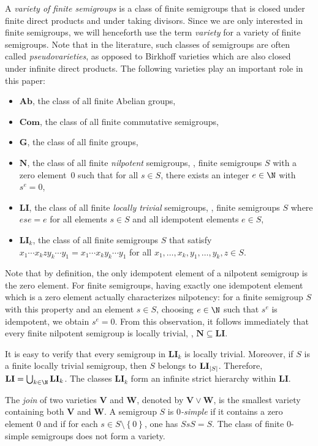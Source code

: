 \documentclass{toc}
\newcommand{\abs}[1]{\ensuremath\left|#1\right|}
\newcommand{\os}[1]{\ensuremath{\left\{#1\right\}}}
\newcommand{\vV}{\mathbf{V}}
\newcommand{\vW}{\mathbf{W}}
\newcommand{\vAb}{\mathbf{Ab}}
\newcommand{\vNil}{\mathbf{N}}
\newcommand{\vLI}{\mathbf{LI}}
\newcommand{\vCom}{\mathbf{Com}}
\newcommand{\vG}{\mathbf{G}}
\begin{document}
A \emph{variety of finite semigroups} is a class of finite semigroups that is
closed under finite direct products and under taking divisors.
%
Since we are only interested in finite semigroups, we will henceforth use the
term \emph{variety} for a variety of finite semigroups.
%
Note that in the literature, such classes of semigroups are often called
\emph{pseudovarieties}, as opposed to Birkhoff varieties which are also closed
under infinite direct products.
%
The following varieties play an important role in this paper:
%
\begin{itemize}
  \item $\vAb$, the class of all finite Abelian groups,
  \item $\vCom$, the class of all finite commutative semigroups,
  \item $\vG$, the class of all finite groups,
  \item $\vNil$, the class of all finite \emph{nilpotent} semigroups, \ie, finite
    semigroups $S$ with a zero element~$0$ such that for all $s \in S$, there
    exists an integer $e \in \N$ with $s^e = 0$,
  \item $\vLI$, the class of all finite \emph{locally trivial} semigroups, \ie,
    finite semigroups $S$ where $ese = e$ for all elements $s \in S$ and all
    idempotent elements $e \in S$,
  \item $\vLI_k$, the class of all finite semigroups $S$ that satisfy $x_1
    \cdots x_k z y_k \cdots y_1 = x_1 \cdots x_k y_k \cdots y_1$ for all $x_1,
    \dots, x_k, y_1, \dots, y_k, z \in S$.
\end{itemize}
%
Note that by definition, the only idempotent element of a nilpotent semigroup
is the zero element.
%
For finite semigroups, having exactly one idempotent element which is a zero
element actually characterizes nilpotency:
%
for a finite semigroup $S$ with this property and an element $s \in S$,
choosing $e \in \N$ such that $s^e$ is idempotent, we obtain $s^e = 0$.
%
{}From this observation, it follows immediately that every finite nilpotent
semigroup is locally trivial, \ie, $\vNil \subseteq \vLI$.
%

It is easy to verify that every semigroup in $\vLI_k$ is locally trivial.
Moreover, if $S$ is a finite locally trivial semigroup, then $S$ belongs to
$\vLI_{\abs{S}}$. Therefore, $\vLI = \bigcup_{k \in \N} \vLI_k$. The classes
$\vLI_k$ form an infinite strict hierarchy within $\vLI$.

The \emph{join} of two varieties $\vV$ and $\vW$, denoted by $\vV \lor \vW$, is
the smallest variety containing both $\vV$ and $\vW$.
%
A semigroup $S$ is \emph{$0$-simple} if it contains a zero element $0$ and if
for each $s \in S \setminus \os{0}$, one has $SsS = S$.
%
The class of finite $0$-simple semigroups does not form a variety.
\end{document}
